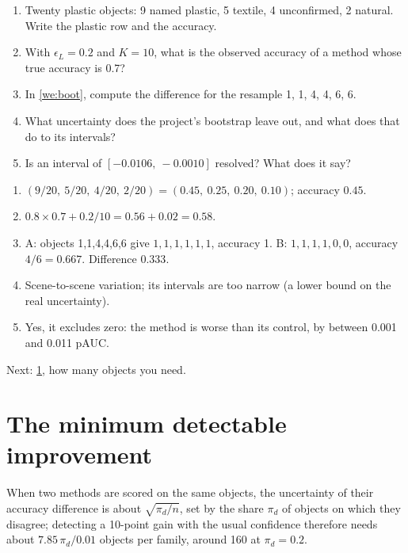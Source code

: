 \documentclass[11pt,a4paper,oneside,openany]{book}
\newcommand{\nextchapter}[1]{\par\medskip\noindent\hfill\textsf{\small Next: #1}\par}
\begin{document}
\begin{checkyourself}
\begin{enumerate}
\item Twenty plastic objects: 9 named plastic, 5 textile, 4 unconfirmed, 2 natural. Write the plastic row and the accuracy.
\item With $\epsilon_L=0.2$ and $K=10$, what is the observed accuracy of a method whose true accuracy is 0.7?
\item In \cref{we:boot}, compute the difference for the resample 1, 1, 4, 4, 6, 6.
\item What uncertainty does the project's bootstrap leave out, and what does that do to its intervals?
\item Is an interval of $[-0.0106,\ -0.0010]$ resolved? What does it say?
\end{enumerate}
\end{checkyourself}

\begin{answers}
\begin{enumerate}
\item $(9/20,\ 5/20,\ 4/20,\ 2/20)=(0.45,\ 0.25,\ 0.20,\ 0.10)$; accuracy $0.45$.
\item $0.8\times0.7+0.2/10=0.56+0.02=0.58$.
\item A: objects 1,1,4,4,6,6 give $1,1,1,1,1,1$, accuracy 1. B: $1,1,1,1,0,0$, accuracy $4/6=0.667$. Difference $0.333$.
\item Scene-to-scene variation; its intervals are too narrow (a lower bound on the real uncertainty).
\item Yes, it excludes zero: the method is worse than its control, by between 0.001 and 0.011 pAUC.
\end{enumerate}
\end{answers}

\nextchapter{\cref{ch:mde}, how many objects you need.}

\chapter{The minimum detectable improvement}
\label{ch:mde}

\begin{onething}
When two methods are scored on the same objects, the uncertainty of their accuracy difference is about $\sqrt{\pi_d/n}$, set by the share $\pi_d$ of objects on which they
disagree; detecting a 10-point gain with the usual confidence therefore needs about $7.85\,\pi_d/0.01$ objects per family, around 160 at $\pi_d=0.2$.
\end{onething}
\end{document}
